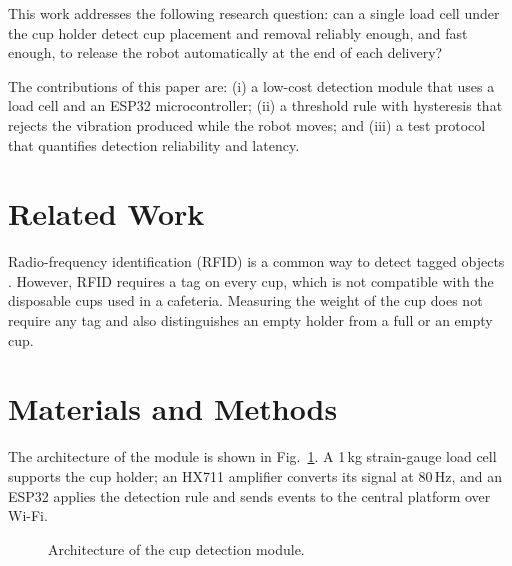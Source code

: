 \documentclass[lettersize,journal]{IEEEtran}
\begin{document}
This work addresses the following research question: can a single
load cell under the cup holder detect cup placement and removal reliably enough, and
fast enough, to release the robot automatically at the end of each delivery?

The contributions of this paper are: (i) a low-cost detection
module that uses a load cell and an ESP32 microcontroller; (ii) a threshold rule
with hysteresis that rejects the vibration produced while the robot moves; and (iii)
a test protocol that quantifies detection reliability and
latency.

\section{Related Work}
\label{sec:related}

Radio-frequency identification (RFID) is a common way to detect tagged objects \cite{want2006rfid}. However, RFID requires a tag on every cup, which is not compatible with the disposable cups used in a cafeteria. Measuring the weight of the cup does not require any tag and also distinguishes an empty holder from a full or an empty cup.

\section{Materials and Methods}
\label{sec:methods}

The architecture of the module is shown in Fig.~\ref{fig:arch}. A 1\,kg strain-gauge load cell supports the cup holder; an HX711 amplifier converts its signal at 80\,Hz, and an ESP32 applies the detection rule and sends events to the central platform over Wi-Fi.

\begin{figure}[!t]
\centering
{}
\caption{Architecture of the cup detection module.}
\label{fig:arch}
\end{figure}
\end{document}
